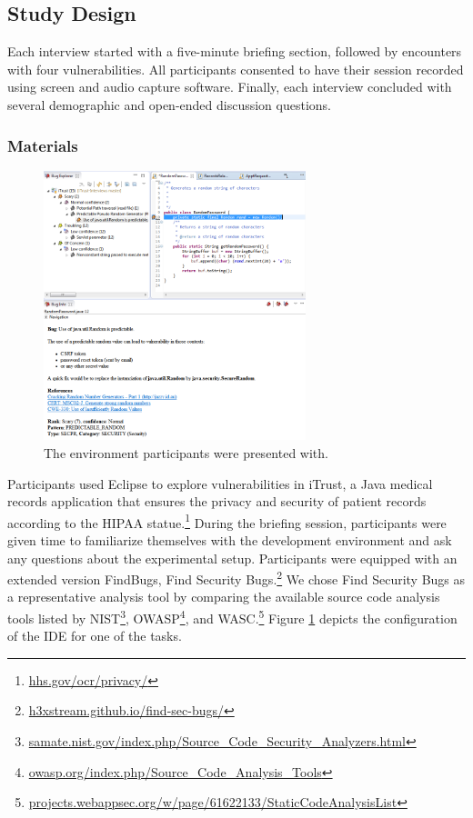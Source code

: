 \documentclass[conference]{IEEEtran}
\begin{document}
\subsection{Study Design}
\label{studyDesign}
Each interview started with a five-minute briefing section, followed by encounters with four vulnerabilities.
All participants consented to have their session recorded using screen and audio capture software.
Finally, each interview concluded with several demographic and open-ended discussion questions.


\subsubsection{Materials}

\begin{figure}
\centering
\includegraphics[width=3in]{Images/environment.png}
\caption{The environment participants were presented with.}
\label{fig:environment} 
\end{figure}
	

Participants used Eclipse to explore vulnerabilities in iTrust, a Java medical records application that ensures the privacy and security of patient records according to the HIPAA statue.\footnote{\url{hhs.gov/ocr/privacy/}} 
During the briefing session, participants were given time to familiarize themselves with the development environment and ask any questions about the experimental setup.
Participants were equipped with an extended version FindBugs, Find Security Bugs.\footnote{\url{h3xstream.github.io/find-sec-bugs/}} 
We chose Find Security Bugs as a representative analysis tool by comparing the available source code analysis tools listed by NIST\footnote{\url{samate.nist.gov/index.php/Source_Code_Security_Analyzers.html}}, OWASP\footnote{\url{owasp.org/index.php/Source_Code_Analysis_Tools}}, and WASC.\footnote{\url{projects.webappsec.org/w/page/61622133/StaticCodeAnalysisList}}
Figure \ref{fig:environment} depicts the configuration of the IDE for one of the tasks.
\end{document}
